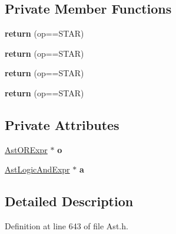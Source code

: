 \subsection*{Private Member Functions}
\begin{DoxyCompactItemize}
\item 
\hypertarget{classAstLogicAndExpr_ab0a23d100ac6108a54ac789989d326c2}{{\bfseries return} (op==S\-T\-A\-R)}\label{classAstLogicAndExpr_ab0a23d100ac6108a54ac789989d326c2}

\item 
\hypertarget{classAstLogicAndExpr_ab0a23d100ac6108a54ac789989d326c2}{{\bfseries return} (op==S\-T\-A\-R)}\label{classAstLogicAndExpr_ab0a23d100ac6108a54ac789989d326c2}

\item 
\hypertarget{classAstLogicAndExpr_ab0a23d100ac6108a54ac789989d326c2}{{\bfseries return} (op==S\-T\-A\-R)}\label{classAstLogicAndExpr_ab0a23d100ac6108a54ac789989d326c2}

\item 
\hypertarget{classAstLogicAndExpr_ab0a23d100ac6108a54ac789989d326c2}{{\bfseries return} (op==S\-T\-A\-R)}\label{classAstLogicAndExpr_ab0a23d100ac6108a54ac789989d326c2}

\end{DoxyCompactItemize}
\subsection*{Private Attributes}
\begin{DoxyCompactItemize}
\item 
\hypertarget{classAstLogicAndExpr_a047e943362c7d33c78344b46ad69392c}{\hyperlink{classAstORExpr}{Ast\-O\-R\-Expr} $\ast$ {\bfseries o}}\label{classAstLogicAndExpr_a047e943362c7d33c78344b46ad69392c}

\item 
\hypertarget{classAstLogicAndExpr_a74a88c78a3c3e0d185ceb216f8e979d4}{\hyperlink{classAstLogicAndExpr}{Ast\-Logic\-And\-Expr} $\ast$ {\bfseries a}}\label{classAstLogicAndExpr_a74a88c78a3c3e0d185ceb216f8e979d4}

\end{DoxyCompactItemize}


\subsection{Detailed Description}


Definition at line 643 of file Ast.\-h.



